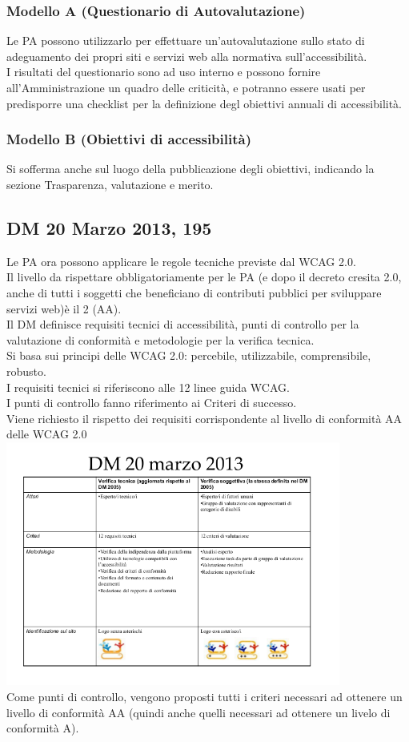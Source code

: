 \documentclass{article}
\begin{document}
\subsubsection{Modello A (Questionario di Autovalutazione)}
Le PA possono utilizzarlo per effettuare un'autovalutazione sullo stato di adeguamento dei propri siti e servizi web alla normativa sull'accessibilità.\\
I risultati del questionario sono ad uso interno e possono fornire all'Amministrazione un quadro delle criticità, e potranno essere usati per predisporre una checklist per la definizione degl obiettivi annuali di accessibilità.
\subsubsection{Modello B (Obiettivi di accessibilità)}
Si sofferma anche sul luogo della pubblicazione degli obiettivi, indicando la sezione Trasparenza, valutazione e merito.
\subsection{DM 20 Marzo 2013, 195}
Le PA ora possono applicare le regole tecniche previste dal WCAG 2.0.\\
Il livello da rispettare obbligatoriamente per le PA (e dopo il decreto cresita 2.0, anche di tutti i soggetti che beneficiano di contributi pubblici per sviluppare servizi web)è il 2 (AA).\\
Il DM definisce requisiti tecnici di accessibilità, punti di controllo per la valutazione di conformità e metodologie per la verifica tecnica.\\
Si basa sui principi delle WCAG 2.0: percebile, utilizzabile, comprensibile, robusto.\\
I requisiti tecnici si riferiscono alle 12 linee guida WCAG.\\
I punti di controllo fanno riferimento ai Criteri di successo.\\
Viene richiesto il rispetto dei requisiti corrispondente al livello di conformità AA delle WCAG 2.0\\
\includegraphics[width=11cm]{20mar2013}\\
Come punti di controllo, vengono proposti tutti i criteri necessari ad ottenere un livello di conformità AA (quindi anche quelli necessari ad ottenere un livelo di conformità  A).
\end{document}
